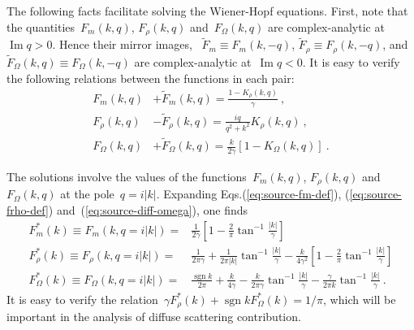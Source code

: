 \documentclass[preprint,aps,eqsecnum]{revtex4-1}
\renewcommand{\Im}{\mathop{\mathrm{Im}}\nolimits}
\newcommand{\sgn}{\mathop{\mathrm{sgn}}\nolimits}
\begin{document}
The following facts facilitate solving the Wiener-Hopf equations.
First, note that the quantities~$F_m(k, q)$, $F_\rho(k, q)$
and~$F_\Omega(k, q)$ are
complex-analytic at~$\Im q > 0$. Hence their mirror images,
~$\tilde{F}_m \equiv F_m(k, -q)$,
${\tilde F}_{\rho} \equiv F_\rho(k, -q)$,
and~$\tilde{F}_\Omega(k, q) \equiv F_\Omega(k, -q)$ are
complex-analytic at~$\Im q < 0$. It is easy to verify the following relations
between the functions in each pair:
\begin{align}
  \label{eq:fm-identity}
  F_m(k, q) &+ \tilde{F}_m(k, q) = \frac{1 - K_\rho(k, q)}{\gamma} \ , \\
  \label{eq:frho-identity}
  F_\rho(k, q) &- \tilde{F}_\rho(k, q) = \frac{i q}{q^2 + k^2} K_\rho(k, q)
  \ ,\\
  \label{eq:fomega-identity}
  F_\Omega(k, q) &+ \tilde{F}_\Omega(k, q)
          = \frac{k}{2\gamma} \left[1 - K_\Omega(k, q)\right]
  \ .
\end{align}

The solutions involve the values of the functions~$F_m(k, q)$,
$F_\rho(k, q)$ and~$F_\Omega(k, q)$ at the pole~$q = i |k|$.
Expanding Eqs.(\ref{eq:source-fm-def}), (\ref{eq:source-frho-def})
and~(\ref{eq:source-diff-omega}), one finds
\begin{align}
  \label{eq:fm-star}
  F_m^\ast(k) \equiv F_m(k, q = i |k|)
       ={}& \frac{1}{2\gamma}
        \left[ 1 - \frac{2}{\pi}\tan^{-1}\frac{|k|}{\gamma} \right] \\
  \label{eq:frho-star}
  F_\rho^\ast(k) \equiv F_\rho(k, q = i |k|)
  ={}&  \frac{1}{2\pi \gamma} + \frac{1}{2\pi |k|} \tan^{-1}\frac{|k|}{\gamma}
  - \frac{k}{4\gamma^2}
    \left[1 - \frac{2}{\pi} \tan^{-1} \frac{|k|}{\gamma}\right]
  \\
  \label{eq:fomega-star}
  F_\Omega^\ast(k) \equiv F_\Omega(k, q = i |k|)
  ={}& \frac{\sgn k}{2\pi} +  \frac{k}{4\gamma}
       - \frac{k}{2\pi \gamma}  \tan^{-1}\frac{|k|}{\gamma}
       - \frac{\gamma}{2\pi k}  \tan^{-1}\frac{|k|}{\gamma}
  \ .
\end{align}
It is easy to verify
the relation~$\gamma F_\rho^\ast(k) + \sgn k F_\Omega^\ast(k) = 1/\pi$,
which will be important in the analysis of diffuse scattering contribution.
\end{document}
